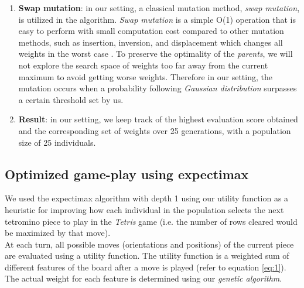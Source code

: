 \documentclass{article} %
\begin{document}
\begin{multicols}{2}
\begin{enumerate}
% 
% 

\item \textbf{Swap mutation}: in our setting, a classical mutation method, \textsl{swap mutation}, is utilized in the algorithm. \textsl{Swap mutation} is a simple O(1) operation that is easy to perform with small computation cost compared to other mutation methods, such as insertion, inversion, and displacement which changes all weights in the worst case \cite{swapmutation}. To preserve the optimality of the \textsl{parents}, we will not explore the search space of weights too far away from the current maximum to avoid getting worse weights. Therefore in our setting, the mutation occurs when a probability following \textsl {Gaussian distribution} surpasses a certain threshold set by us. 

% 
% 

\item \textbf{Result}: in our setting, we keep track of the highest evaluation score obtained and the corresponding set of weights over 25 generations, with a population size of 25 individuals. 

\end{enumerate}
 

\subsection{Optimized game-play using expectimax}\label{Game-play Strategy}
We used the expectimax algorithm with depth 1 using our utility function as a heuristic for improving how each individual in the population selects the next tetromino piece to play in the \textsl{Tetris} game (i.e. the number of rows cleared would be maximized by that move). \\

\noindent
At each turn, all possible moves (orientations and positions) of the current piece are evaluated using a utility function. The utility function is a weighted sum of different features of the board after a move is played (refer to equation  \ref{eq:1}). The actual weight for each feature is determined using our \textit{genetic algorithm}. \\


\end{multicols}
\end{document}
